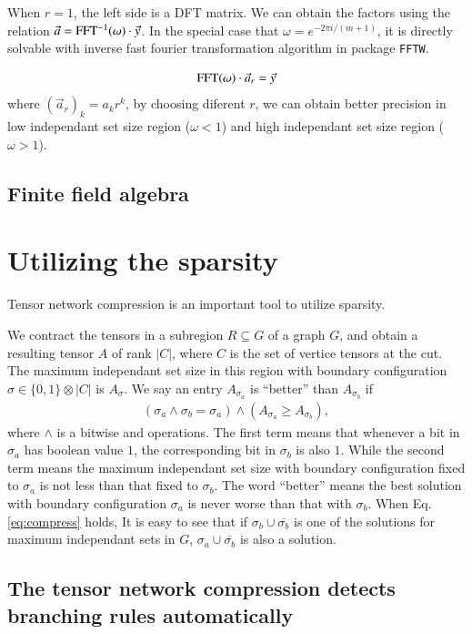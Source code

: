 \documentclass{article}
\newcommand{\<}{\langle}
\renewcommand{\>}{\rangle}
\theoremstyle{definition}\newtheorem{definition}{\textit{Definition}}
\begin{document}
When $r=1$, the left side is a DFT matrix. We can obtain the factors using the relation $\vec a = {\rm FFT^{-1}}(\omega) \cdot \vec y$.
In the special case that $\omega = e^{-2\pi i/(m+1)}$, it is directly solvable with inverse fast fourier transformation algorithm in package \texttt{FFTW}.

\begin{equation}
{\rm FFT}(\omega) \cdot \vec a_r = \vec y
\end{equation}
where $(\vec a_r)_k = a_k r ^k$, by choosing diferent $r$, we can obtain better precision in low independant set size region  ($\omega<1$) and high independant set size region ($\omega>1$).

\subsection{Finite field algebra}

\section{Utilizing the sparsity}
Tensor network compression is an important tool to utilize sparsity.

We contract the tensors in a subregion $R \subseteq G$ of a graph $G$, and obtain a resulting tensor $A$ of rank $|C|$, where $C$ is the set of vertice tensors at the cut.
The maximum independant set size in this region with boundary configuration $\sigma \in \{0,1\}\otimes |C|$ is $A_{\sigma}$.
We say an entry $A_{\sigma_a}$ is ``better'' than $A_{\sigma_b}$ if
\begin{align}
(\sigma_a \land \sigma_b = \sigma_a) \land (A_{\sigma_a} \geq A_{\sigma_b}),\label{eq:compress}
\end{align}
where $\land$ is a bitwise and operations.
The first term means that whenever a bit in $\sigma_a$ has boolean value $1$, the corresponding bit in $\sigma_b$ is also $1$.
While the second term means the maximum independant set size with boundary configuration fixed to $\sigma_a$ is not less than that fixed to $\sigma_b$.
The word ``better'' means the best solution with boundary configuration $\sigma_a$ is never worse than that with $\sigma_b$.
When Eq. \ref{eq:compress} holds, It is easy to see that if $\sigma_b \cup \overline{\sigma_b}$ is one of the solutions for maximum independant sets in $G$, $\sigma_a \cup \overline{\sigma_b}$ is also a solution.


\subsection{The tensor network compression detects branching rules automatically}
\end{document}
